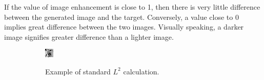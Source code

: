 \documentclass[letterpaper]{article} %
\begin{document}
If the value of image enhancement
is close to 1, then there is very little difference between the generated
image and the target.
Conversely, a value close to 0 implies great difference between the two images.
Visually speaking, a darker image signifies greater difference than a lighter image.

\begin{figure}[h!]
\centering
\begin{subfigure}{0.22\textwidth}
\begin{center}
\begin{minipage}[t]{0.75\linewidth}
\begin{centering}
{\includegraphics[width=\linewidth]{shadow_standard.png}}
\caption{Example of standard $L^2$ calculation.}
\label{fig:shadow_standard}
\end{centering}
\end{minipage}
\end{center}
\end{subfigure}
\begin{subfigure}{0.22\textwidth}
\begin{center}
\begin{minipage}[t]{0.75\linewidth}
\begin{centering}

\end{centering}
\end{minipage}
\end{center}
\end{subfigure}
\end{figure}
\end{document}

